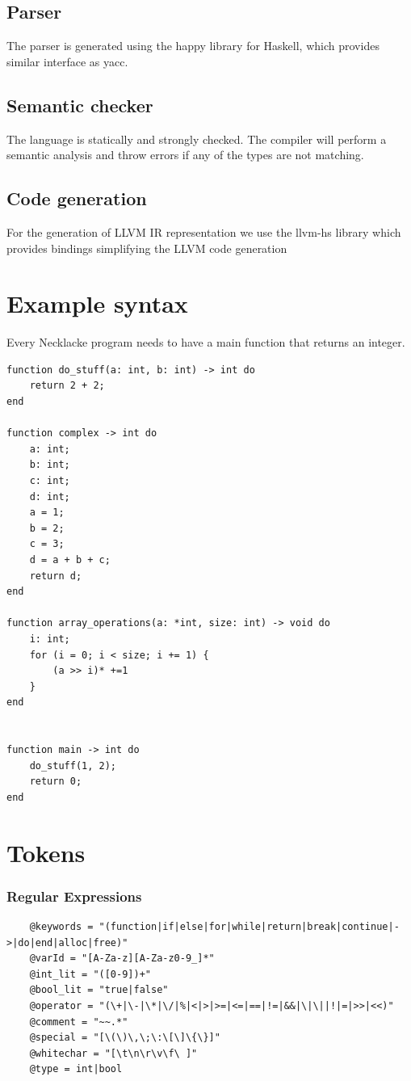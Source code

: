 \documentclass{article}
\begin{document}
\subsection{Parser}
The parser is generated using the happy library for Haskell, which provides similar interface as yacc. 


\subsection{Semantic checker}
The language is statically and strongly checked. The compiler will perform a semantic analysis and throw errors if any of the types are not matching. 



\subsection{Code generation}
For the generation of LLVM IR representation we use the llvm-hs library which provides bindings simplifying the LLVM code generation



\section{Example syntax}
Every Necklacke program needs to have a main function that returns an integer.
\begin{verbatim}
function do_stuff(a: int, b: int) -> int do
    return 2 + 2;
end

function complex -> int do
    a: int;
    b: int;
    c: int;
    d: int;
    a = 1;
    b = 2;
    c = 3;
    d = a + b + c;
    return d;
end

function array_operations(a: *int, size: int) -> void do
    i: int;
    for (i = 0; i < size; i += 1) {
        (a >> i)* +=1
    }
end


function main -> int do
    do_stuff(1, 2);
    return 0;
end
\end{verbatim}

\section{Tokens}
\subsubsection{Regular Expressions}
\begin{verbatim}
    @keywords = "(function|if|else|for|while|return|break|continue|->|do|end|alloc|free)"
    @varId = "[A-Za-z][A-Za-z0-9_]*"
    @int_lit = "([0-9])+" 
    @bool_lit = "true|false"
    @operator = "(\+|\-|\*|\/|%|<|>|>=|<=|==|!=|&&|\|\||!|=|>>|<<)"
    @comment = "~~.*"
    @special = "[\(\)\,\;\:\[\]\{\}]"
    @whitechar = "[\t\n\r\v\f\ ]"
    @type = int|bool
\end{verbatim}
\end{document}
